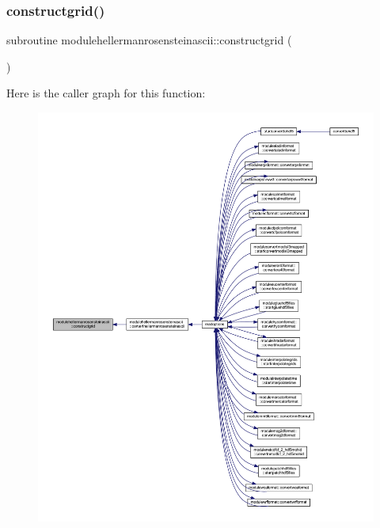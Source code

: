 \subsubsection{\texorpdfstring{constructgrid()}{constructgrid()}}
{\footnotesize\ttfamily subroutine modulehellermanrosensteinascii\+::constructgrid (\begin{DoxyParamCaption}{ }\end{DoxyParamCaption})\hspace{0.3cm}{\ttfamily [private]}}

Here is the caller graph for this function\+:\nopagebreak
\begin{figure}[H]
\begin{center}
\leavevmode
\includegraphics[width=350pt]{namespacemodulehellermanrosensteinascii_aa865ee380c14fc3435be60b54b2d2513_icgraph}
\end{center}
\end{figure}
\mbox{\label{namespacemodulehellermanrosensteinascii_ae9a4ebb5ba70b59aa745588ca89b7a95}} 
